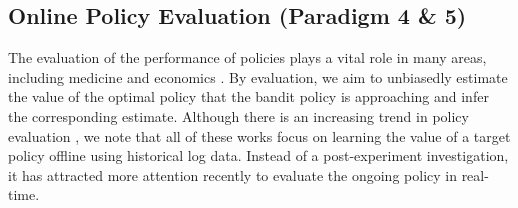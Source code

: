 



\subsection{Online Policy Evaluation (Paradigm 4 \& 5)} \label{sec:bandit_evaluation}

The evaluation of the performance of policies plays a vital role in many areas, including medicine and economics \citep[see e.g., ][]{chakraborty2013statistical,athey201921}. By evaluation, we aim to unbiasedly estimate the value of the optimal policy that the bandit policy is approaching and infer the corresponding estimate. Although there is an increasing trend in policy evaluation \citep[see e.g., ][]{li2011unbiased,dudik2011doubly,jiang2016doubly,swaminathan2017off,wang2017optimal,kallus2018policy,su2019doubly}, we note that all of these works focus on learning the value of a target policy offline using historical log data. Instead of a post-experiment investigation,  it has attracted more attention recently to evaluate the ongoing policy in real-time.



